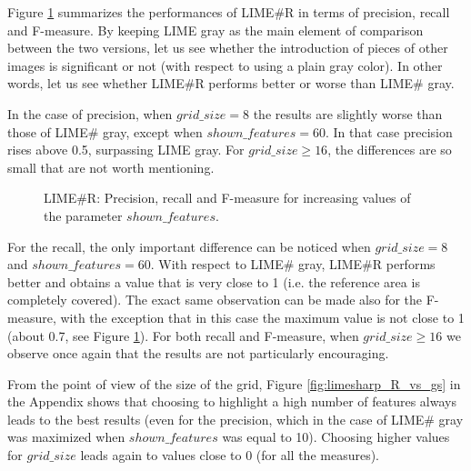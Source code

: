 \documentclass[12pt, twoside, a4paper]{report}
\begin{document}
Figure \ref{subfig:limesharp_R_vs_sf} summarizes the performances of LIME\#R in terms of precision, recall and F-measure. 
By keeping LIME gray as the main element of comparison between the two versions, let us see whether the introduction of pieces of other images is significant or not (with respect to using a plain gray color). In other words, let us see whether LIME\#R performs better or worse than LIME\# gray.

In the case of precision, when $grid\_size = 8$ the results are slightly worse than those of LIME\# gray, except when $shown\_features = 60$. In that case precision rises above 0.5, surpassing LIME gray. For $grid\_size \geq 16$, the differences are so small that are not worth mentioning.

\begin{figure}
\centering
{}
\caption{LIME\#R: Precision, recall and F-measure for increasing values of the parameter $shown\_features$.}
\label{subfig:limesharp_R_vs_sf}
\end{figure}

For the recall, the only important difference can be noticed when $grid\_size = 8$ and $shown\_features = 60$. With respect to LIME\# gray, LIME\#R performs better and obtains a value that is very close to 1 (i.e. the reference area is completely covered). The exact same observation can be made also for the F-measure, with the exception that in this case the maximum value is not close to 1 (about 0.7, see Figure \ref{subfig:limesharp_R_vs_sf}).
For both recall and F-measure, when $grid\_size \geq 16$ we observe once again that the results are not particularly encouraging.
\bigskip

From the point of view of the size of the grid, Figure \ref{fig:limesharp_R_vs_gs} in the Appendix shows that choosing to highlight a high number of features always leads to the best results (even for the precision, which in the case of LIME\# gray was maximized when $shown\_features$ was equal to 10). 
Choosing higher values for $grid\_size$ leads again to values close to 0 (for all the measures).
\end{document}
